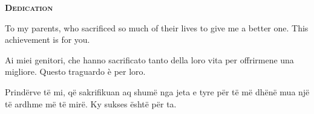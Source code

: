 
\vspace*{45pt}
\begin{flushleft}
	{\Large \textbf{\scshape{Dedication}}}
\end{flushleft}
\vspace*{10pt}

To my parents, who sacrificed so much of their lives to give me a better one. This achievement is for you.


Ai miei genitori, che hanno sacrificato tanto della loro vita per offrirmene una migliore. Questo traguardo è per loro.


Prindërve të mi, që sakrifikuan aq shumë nga jeta e tyre për të më dhënë mua një të ardhme më të mirë. Ky sukses është për ta.
